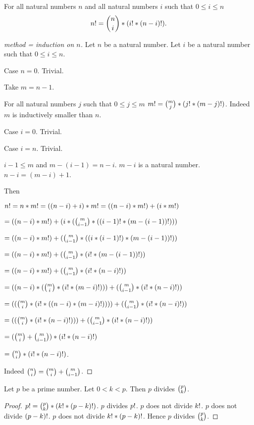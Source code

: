 \documentclass[11pt]{article}
\begin{document}
\begin{forthel}
\begin{lemma} For all natural numbers $n$ and all natural numbers $i$ 
such that  $0 \leq i \leq n$
$$n ! = {n \choose i} * (i ! * (n-i) !).$$
\end{lemma}

\begin{proof}[method = induction on $n$]
Let $n$ be a natural number.
Let $i$ be a natural number such that $0 \leq i \leq n$.

Case $n = 0$. Trivial.

Take $m = n - 1$.  

For all natural numbers $j$ such that $0 \leq j \leq m$ $m ! = 
{m \choose j} * (j ! * (m-j) !)$.
Indeed $m$ is inductively smaller than $n$.

Case $i = 0$. Trivial.

Case $i = n$. Trivial.

$i - 1 \leq m$ and $m - (i-1) = n - i$. $m - i$ is a natural number. 
$n - i = (m - i) + 1$.

Then

$n ! = n * m ! = ((n-i) + i) * m ! = ((n-i) * m !) + (i * m !)$

$= ((n-i) * m !) + (i * ({m \choose i-1} * ((i-1) ! * (m - (i-1)) !)))$

$= ((n-i) * m !) + ({m \choose i-1} * ((i * (i-1) !) * (m - (i-1)) !))$

$=  ((n-i) * m !) + ({m \choose i-1} * (i ! * (m - (i-1)) !))$

$=  ((n-i) * m !) + ({m \choose i-1} * (i ! * (n-i) !))$

$= ((n-i) * ({m \choose i} * (i ! * (m-i) !))) + ({m \choose i-1} * (i ! * (n-i) !))$

$= (({m \choose i} * (i ! * ((n-i) * (m-i) !)))) + ({m \choose i-1} * (i ! * (n-i) !))$

$= (({m \choose i} * (i ! * (n-i) !))) + ({m \choose i-1} * (i ! * (n-i) !))$

$= ({m \choose i} + {m \choose i-1}) * (i ! * (n-i) !) $

$=  {n \choose i} * (i ! * (n-i) !)$.

Indeed ${n \choose i} = {m \choose i} + {m \choose i-1}$.

\end{proof}


\begin{lemma}
Let $p$ be a prime number.
Let $0 < k < p$. Then
$p$ divides ${p \choose k}$.
\end{lemma}
\begin{proof}
$p ! = {p \choose k} * (k ! * (p-k) !)$.
$p$ divides $p !$.
$p$ does not divide $k !$.
$p$ does not divide $(p-k) !$.
$p$ does not divide $k ! * (p-k) !$.
Hence 
$p$ divides ${p \choose k}$.
\end{proof}

\end{forthel}
\end{document}
